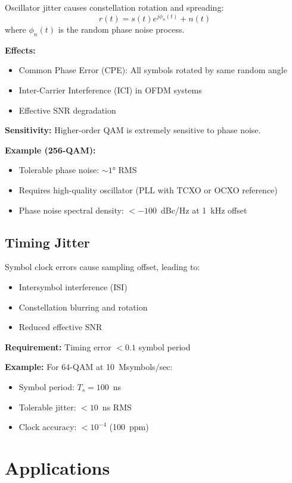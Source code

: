 Oscillator jitter causes constellation rotation and spreading:
\begin{equation}
r(t) = s(t) e^{j\phi_n(t)} + n(t)
\label{eq:phase-noise-model}
\end{equation}
where $\phi_n(t)$ is the random phase noise process.

\textbf{Effects:}
\begin{itemize}
\item Common Phase Error (CPE): All symbols rotated by same random angle
\item Inter-Carrier Interference (ICI) in OFDM systems
\item Effective SNR degradation
\end{itemize}

\textbf{Sensitivity:} Higher-order QAM is extremely sensitive to phase noise.

\textbf{Example (256-QAM):}
\begin{itemize}
\item Tolerable phase noise: $\sim 1°$ RMS
\item Requires high-quality oscillator (PLL with TCXO or OCXO reference)
\item Phase noise spectral density: $< -100$~dBc/Hz at 1~kHz offset
\end{itemize}

\subsection{Timing Jitter}

Symbol clock errors cause sampling offset, leading to:
\begin{itemize}
\item Intersymbol interference (ISI)
\item Constellation blurring and rotation
\item Reduced effective SNR
\end{itemize}

\textbf{Requirement:} Timing error $< 0.1$ symbol period

\textbf{Example:} For 64-QAM at 10~Msymbols/sec:
\begin{itemize}
\item Symbol period: $T_s = 100$~ns
\item Tolerable jitter: $< 10$~ns RMS
\item Clock accuracy: $< 10^{-4}$ (100~ppm)
\end{itemize}

\section{Applications}

